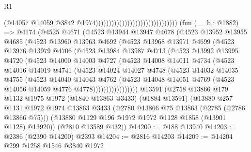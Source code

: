 \begin{lexlean}{R1}
\begin{coremodule}
                                                                (@14057
                                                                  @14059
                                                                  @3842
                                                                  @1974)))))))))))))))))))))))))))))))
    (fun (__b : @1882) =>
    @4174
      (@4525
        @4671
        (@4523
          @13944
          @13947
          @4678
          (@4523
            @13952
            @13955
            @4685
            (@4523
              @13960
              @13963
              @4692
              (@4523
                @13968
                @13971
                @4699
                (@4523
                  @13976
                  @13979
                  @4706
                  (@4523
                    @13984
                    @13987
                    @4713
                    (@4523
                      @13992
                      @13995
                      @4720
                      (@4523
                        @14000
                        @14003
                        @4727
                        (@4523
                          @14008
                          @14011
                          @4734
                          (@4523
                            @14016
                            @14019
                            @4741
                            (@4523
                              @14024
                              @14027
                              @4748
                              (@4523
                                @14032
                                @14035
                                @4755
                                (@4523
                                  @14040
                                  @14043
                                  @4762
                                  (@4523
                                    @14048
                                    @14051
                                    @4769
                                    (@4523 @14056 @14059 @4776 @4778)))))))))))))))))
    @13591
    (@2758
      @13866
      @179
      @1132
      @1975
      @1972
      (@1840 @13863 @3433)
      (@1884 @13591)
      (@13880
        @257
        @1131
        @1972
        @1974
        @13863
        @3433
        (@2780 @13866 @75 @13863 (@2785 (@2786 @13866 @75)))
        (@13880 @1129 @196 @1972 @1972 @1128 @1858 (@13901 @1128) @13920))
      (@2810 @13589 @432))
@14200 := @188 @13940
@14203 := @2386 (@2390 @14200) @2393
@14204 := @2816 @14203
@14209 := @14204 @299 @1258 @1546 @3840 @1972

\end{coremodule}
\end{lexlean}
